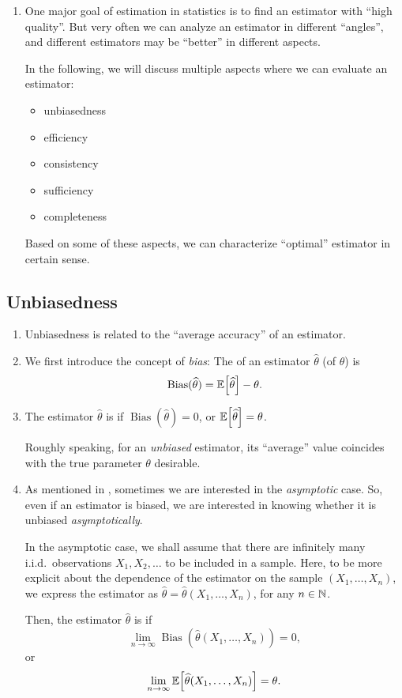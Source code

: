 \begin{enumerate}
\item One major goal of estimation in statistics is to find an estimator with
``high quality''. But very often we can analyze an estimator in different
``angles'', and different estimators may be ``better'' in different aspects.

In the following, we will discuss multiple aspects where we can evaluate an
estimator:
\begin{itemize}
\item unbiasedness
\item efficiency
\item consistency
\item sufficiency
\item completeness
\end{itemize}
Based on some of these aspects, we can characterize ``optimal'' estimator in
certain sense.
\end{enumerate}
\subsection{Unbiasedness}
\begin{enumerate}
\item Unbiasedness is related to the ``average accuracy'' of an estimator.
\item We first introduce the concept of \emph{bias}: The  of an
estimator \(\widehat{\theta}\) (of \(\theta\)) is
\[
\operatorname{Bias}(\widehat{\theta})=\mathbb{E}\qty[\widehat{\theta}]-\theta.
\]
\item The estimator \(\widehat{\theta}\) is  if
\(\operatorname{Bias}(\widehat{\theta})=0\), or
\(\mathbb{E}\qty[\widehat{\theta}]=\theta\).

\begin{note}
Roughly speaking, for an \emph{unbiased} estimator, its ``average'' value
coincides with the true parameter \(\theta\)  desirable.
\end{note}

\item As mentioned in , sometimes we are
interested in the \emph{asymptotic} case. So, even if an estimator is biased,
we are interested in knowing whether it is unbiased \emph{asymptotically}.

In the asymptotic case, we shall assume that there are infinitely many i.i.d.\
observations \(X_1,X_2,\dotsc\) to be included in a sample. Here, to be more
explicit about the dependence of the estimator on the sample
\((X_1,\dotsc,X_n)\), we express the estimator as
\(\widehat{\theta}=\widehat{\theta}(X_1,\dotsc,X_n)\), for any \(n\in\mathbb{N}\).

Then, the estimator \(\widehat{\theta}\) is  if
\[
\lim_{n\to \infty}\operatorname{Bias}(\widehat{\theta}(X_1,\dotsc,X_n))=0,
\]
or
\[
\lim_{n\to \infty}\mathbb{E}\qty[\widehat{\theta}(X_1,\dotsc,X_n)]=\theta.
\]
\end{enumerate}
